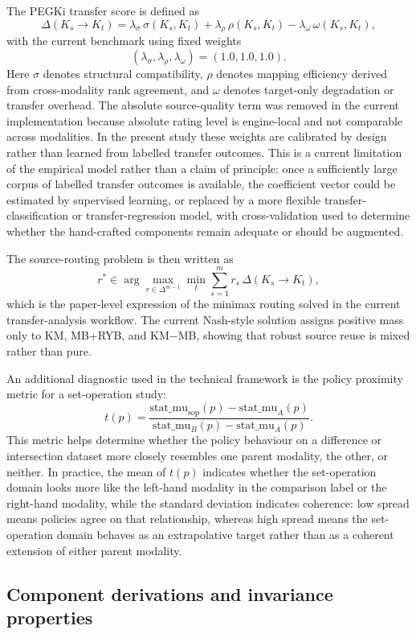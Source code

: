 \documentclass[twoside,twocolumn,9pt]{article}
\begin{document}
The PEGKi transfer score is defined as
\[
\Delta(K_s \rightarrow K_t)=
\lambda_{\sigma}\,\sigma(K_s,K_t)+
\lambda_{\rho}\,\rho(K_s,K_t)-
\lambda_{\omega}\,\omega(K_s,K_t),
\]
with the current benchmark using fixed weights
\[
(\lambda_{\sigma},\lambda_{\rho},\lambda_{\omega})=(1.0,1.0,1.0).
\]
Here $\sigma$ denotes structural compatibility, $\rho$ denotes mapping efficiency derived from cross-modality rank agreement, and $\omega$ denotes target-only degradation or transfer overhead. The absolute source-quality term was removed in the current implementation because absolute rating level is engine-local and not comparable across modalities. In the present study these weights are calibrated by design rather than learned from labelled transfer outcomes. This is a current limitation of the empirical model rather than a claim of principle: once a sufficiently large corpus of labelled transfer outcomes is available, the coefficient vector could be estimated by supervised learning, or replaced by a more flexible transfer-classification or transfer-regression model, with cross-validation used to determine whether the hand-crafted components remain adequate or should be augmented.

The source-routing problem is then written as
\[
r^\ast \in \arg\max_{r\in \Delta^{m-1}} \min_{t} \sum_{s=1}^{m} r_s\,\Delta(K_s\rightarrow K_t),
\]
which is the paper-level expression of the minimax routing solved in the current transfer-analysis workflow. The current Nash-style solution assigns positive mass only to KM, MB+RYB, and KM$-$MB, showing that robust source reuse is mixed rather than pure.

An additional diagnostic used in the technical framework is the policy proximity metric for a set-operation study:
\[
t(p)=\frac{\mathrm{stat\_mu}_{\mathrm{sop}}(p)-\mathrm{stat\_mu}_{A}(p)}
{\mathrm{stat\_mu}_{B}(p)-\mathrm{stat\_mu}_{A}(p)}.
\]
This metric helps determine whether the policy behaviour on a difference or intersection dataset more closely resembles one parent modality, the other, or neither. In practice, the mean of $t(p)$ indicates whether the set-operation domain looks more like the left-hand modality in the comparison label or the right-hand modality, while the standard deviation indicates coherence: low spread means policies agree on that relationship, whereas high spread means the set-operation domain behaves as an extrapolative target rather than as a coherent extension of either parent modality.

\subsection{Component derivations and invariance properties}
\end{document}
